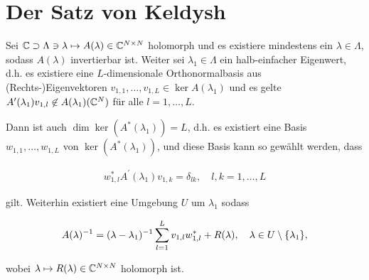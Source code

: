 \section{Der Satz von Keldysh}

\begin{theorem} \label{keldysh_nicht_linear}

    Sei $\mathbb{C}\supset \Lambda \ni \lambda \mapsto A(\lambda) \in \mathbb{C}^{N \times N}$ holomorph und es existiere mindestens ein $\lambda \in \Lambda$, sodass $A(\lambda)$ invertierbar ist.
    Weiter sei $\lambda_1 \in \Lambda$ ein halb-einfacher Eigenwert, d.h. es existiere eine $L$-dimensionale Orthonormalbasis aus (Rechts-)Eigenvektoren $v_{1, 1}, \dots, v_{1, L} \in \ker A(\lambda_1)$ und es gelte $A^\prime(\lambda_1) v_{1, l} \not \in A(\lambda_1)(\mathbb{C}^N)$ für alle $l = 1, \dots, L$.

    Dann ist auch $\dim \ker(A^\ast(\lambda_1)) = L$, d.h. es existiert eine Basis $w_{1, 1}, \dots, w_{1, L}$ von $\ker(A^\ast(\lambda_1))$, und diese Basis kann so gewählt werden, dass

    \begin{align}
        w_{1, l}^\ast A^\prime(\lambda_1) v_{1, k} = \delta_{l k},
        \quad
        l, k = 1, \dots, L
    \end{align}

    gilt.
    Weiterhin existiert eine Umgebung $U$ um $\lambda_1$ sodass

    \begin{align}
        A(\lambda)^{-1}
        =
        (\lambda - \lambda_1)^{-1}
        \sum_{l=1}^L
            v_{1, l} w_{1, l}^\ast
        +
        R(\lambda),
        \quad
        \lambda \in U \setminus {\left \{ \lambda_1 \right \}},
    \end{align}

    wobei $\lambda \mapsto R(\lambda) \in \mathbb{C}^{N \times N}$ holomorph ist.

\end{theorem}

